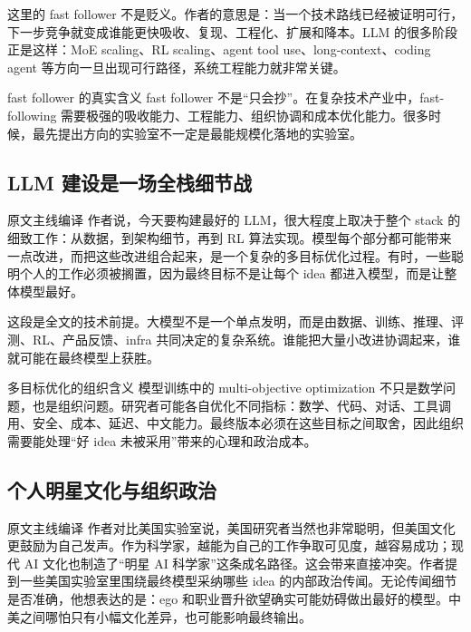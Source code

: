 \documentclass[a4paper]{article}
\begin{document}
这里的 fast follower 不是贬义。作者的意思是：当一个技术路线已经被证明可行，下一步竞争就变成谁能更快吸收、复现、工程化、扩展和降本。LLM 的很多阶段正是这样：MoE scaling、RL scaling、agent tool use、long-context、coding agent 等方向一旦出现可行路径，系统工程能力就非常关键。

\begin{importantbox}{fast follower 的真实含义}
fast follower 不是``只会抄''。在复杂技术产业中，fast-following 需要极强的吸收能力、工程能力、组织协调和成本优化能力。很多时候，最先提出方向的实验室不一定是最能规模化落地的实验室。
\end{importantbox}

\subsection{LLM 建设是一场全栈细节战}

\begin{translationbox}{原文主线编译}
作者说，今天要构建最好的 LLM，很大程度上取决于整个 stack 的细致工作：从数据，到架构细节，再到 RL 算法实现。模型每个部分都可能带来一点改进，而把这些改进组合起来，是一个复杂的多目标优化过程。有时，一些聪明个人的工作必须被搁置，因为最终目标不是让每个 idea 都进入模型，而是让整体模型最好。
\end{translationbox}

这段是全文的技术前提。大模型不是一个单点发明，而是由数据、训练、推理、评测、RL、产品反馈、infra 共同决定的复杂系统。谁能把大量小改进协调起来，谁就可能在最终模型上获胜。

\begin{knowledgebox}{多目标优化的组织含义}
模型训练中的 multi-objective optimization 不只是数学问题，也是组织问题。研究者可能各自优化不同指标：数学、代码、对话、工具调用、安全、成本、延迟、中文能力。最终版本必须在这些目标之间取舍，因此组织需要能处理``好 idea 未被采用''带来的心理和政治成本。
\end{knowledgebox}

\subsection{个人明星文化与组织政治}

\begin{translationbox}{原文主线编译}
作者对比美国实验室说，美国研究者当然也非常聪明，但美国文化更鼓励为自己发声。作为科学家，越能为自己的工作争取可见度，越容易成功；现代 AI 文化也制造了``明星 AI 科学家''这条成名路径。这会带来直接冲突。作者提到一些美国实验室里围绕最终模型采纳哪些 idea 的内部政治传闻。无论传闻细节是否准确，他想表达的是：ego 和职业晋升欲望确实可能妨碍做出最好的模型。中美之间哪怕只有小幅文化差异，也可能影响最终输出。
\end{translationbox}
\end{document}

